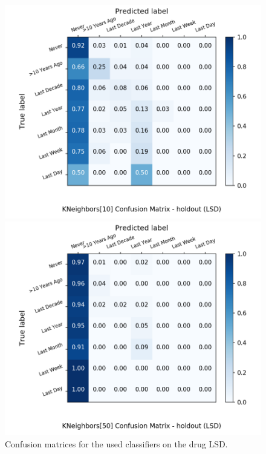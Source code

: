 \begin{figure}[H]
\begin{minipage}[b]{0.32\textwidth}
		\includegraphics[width=1.1\textwidth]{Plots/drugs/LSD_KNeighbors_10_balance_False_holdout.png}
  \end{minipage}
	\begin{minipage}[b]{0.32\textwidth}
		\includegraphics[width=1.1\textwidth]{Plots/drugs/LSD_KNeighbors_50_balance_False_holdout.png}
  \end{minipage}
	\caption{Confusion matrices for the used classifiers on the drug LSD.}
\end{figure}

